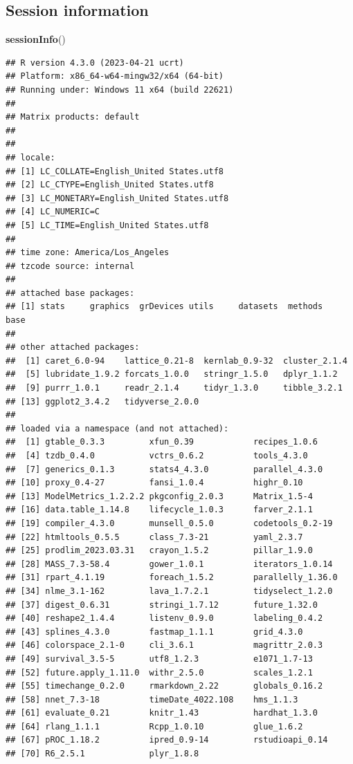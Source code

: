 \documentclass[
]{article}
\newenvironment{Shaded}{\begin{snugshade}}{\end{snugshade}}
\newcommand{\FunctionTok}[1]{\textcolor[rgb]{0.13,0.29,0.53}{\textbf{#1}}}
\newcommand{\NormalTok}[1]{#1}
\begin{document}
\subsection*{Session information}\label{session-information}

\begin{Shaded}
\begin{Highlighting}[]
\FunctionTok{sessionInfo}\NormalTok{()}
\end{Highlighting}
\end{Shaded}

\begin{verbatim}
## R version 4.3.0 (2023-04-21 ucrt)
## Platform: x86_64-w64-mingw32/x64 (64-bit)
## Running under: Windows 11 x64 (build 22621)
## 
## Matrix products: default
## 
## 
## locale:
## [1] LC_COLLATE=English_United States.utf8 
## [2] LC_CTYPE=English_United States.utf8   
## [3] LC_MONETARY=English_United States.utf8
## [4] LC_NUMERIC=C                          
## [5] LC_TIME=English_United States.utf8    
## 
## time zone: America/Los_Angeles
## tzcode source: internal
## 
## attached base packages:
## [1] stats     graphics  grDevices utils     datasets  methods   base     
## 
## other attached packages:
##  [1] caret_6.0-94    lattice_0.21-8  kernlab_0.9-32  cluster_2.1.4  
##  [5] lubridate_1.9.2 forcats_1.0.0   stringr_1.5.0   dplyr_1.1.2    
##  [9] purrr_1.0.1     readr_2.1.4     tidyr_1.3.0     tibble_3.2.1   
## [13] ggplot2_3.4.2   tidyverse_2.0.0
## 
## loaded via a namespace (and not attached):
##  [1] gtable_0.3.3         xfun_0.39            recipes_1.0.6       
##  [4] tzdb_0.4.0           vctrs_0.6.2          tools_4.3.0         
##  [7] generics_0.1.3       stats4_4.3.0         parallel_4.3.0      
## [10] proxy_0.4-27         fansi_1.0.4          highr_0.10          
## [13] ModelMetrics_1.2.2.2 pkgconfig_2.0.3      Matrix_1.5-4        
## [16] data.table_1.14.8    lifecycle_1.0.3      farver_2.1.1        
## [19] compiler_4.3.0       munsell_0.5.0        codetools_0.2-19    
## [22] htmltools_0.5.5      class_7.3-21         yaml_2.3.7          
## [25] prodlim_2023.03.31   crayon_1.5.2         pillar_1.9.0        
## [28] MASS_7.3-58.4        gower_1.0.1          iterators_1.0.14    
## [31] rpart_4.1.19         foreach_1.5.2        parallelly_1.36.0   
## [34] nlme_3.1-162         lava_1.7.2.1         tidyselect_1.2.0    
## [37] digest_0.6.31        stringi_1.7.12       future_1.32.0       
## [40] reshape2_1.4.4       listenv_0.9.0        labeling_0.4.2      
## [43] splines_4.3.0        fastmap_1.1.1        grid_4.3.0          
## [46] colorspace_2.1-0     cli_3.6.1            magrittr_2.0.3      
## [49] survival_3.5-5       utf8_1.2.3           e1071_1.7-13        
## [52] future.apply_1.11.0  withr_2.5.0          scales_1.2.1        
## [55] timechange_0.2.0     rmarkdown_2.22       globals_0.16.2      
## [58] nnet_7.3-18          timeDate_4022.108    hms_1.1.3           
## [61] evaluate_0.21        knitr_1.43           hardhat_1.3.0       
## [64] rlang_1.1.1          Rcpp_1.0.10          glue_1.6.2          
## [67] pROC_1.18.2          ipred_0.9-14         rstudioapi_0.14     
## [70] R6_2.5.1             plyr_1.8.8
\end{verbatim}
\end{document}
